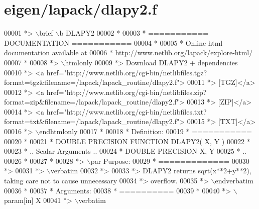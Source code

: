 \hypertarget{eigen_2lapack_2dlapy2_8f_source}{}\section{eigen/lapack/dlapy2.f}
\label{eigen_2lapack_2dlapy2_8f_source}

\begin{DoxyCode}
00001 \textcolor{comment}{*> \(\backslash\)brief \(\backslash\)b DLAPY2}
00002 \textcolor{comment}{*}
00003 \textcolor{comment}{*  =========== DOCUMENTATION ===========}
00004 \textcolor{comment}{*}
00005 \textcolor{comment}{* Online html documentation available at }
00006 \textcolor{comment}{*            http://www.netlib.org/lapack/explore-html/ }
00007 \textcolor{comment}{*}
00008 \textcolor{comment}{*> \(\backslash\)htmlonly}
00009 \textcolor{comment}{*> Download DLAPY2 + dependencies }
00010 \textcolor{comment}{*> <a
       href="http://www.netlib.org/cgi-bin/netlibfiles.tgz?format=tgz&filename=/lapack/lapack\_routine/dlapy2.f"> }
00011 \textcolor{comment}{*> [TGZ]</a> }
00012 \textcolor{comment}{*> <a
       href="http://www.netlib.org/cgi-bin/netlibfiles.zip?format=zip&filename=/lapack/lapack\_routine/dlapy2.f"> }
00013 \textcolor{comment}{*> [ZIP]</a> }
00014 \textcolor{comment}{*> <a
       href="http://www.netlib.org/cgi-bin/netlibfiles.txt?format=txt&filename=/lapack/lapack\_routine/dlapy2.f"> }
00015 \textcolor{comment}{*> [TXT]</a>}
00016 \textcolor{comment}{*> \(\backslash\)endhtmlonly }
00017 \textcolor{comment}{*}
00018 \textcolor{comment}{*  Definition:}
00019 \textcolor{comment}{*  ===========}
00020 \textcolor{comment}{*}
00021 \textcolor{comment}{*       DOUBLE PRECISION FUNCTION DLAPY2( X, Y )}
00022 \textcolor{comment}{* }
00023 \textcolor{comment}{*       .. Scalar Arguments ..}
00024 \textcolor{comment}{*       DOUBLE PRECISION   X, Y}
00025 \textcolor{comment}{*       ..}
00026 \textcolor{comment}{*  }
00027 \textcolor{comment}{*}
00028 \textcolor{comment}{*> \(\backslash\)par Purpose:}
00029 \textcolor{comment}{*  =============}
00030 \textcolor{comment}{*>}
00031 \textcolor{comment}{*> \(\backslash\)verbatim}
00032 \textcolor{comment}{*>}
00033 \textcolor{comment}{*> DLAPY2 returns sqrt(x**2+y**2), taking care not to cause unnecessary}
00034 \textcolor{comment}{*> overflow.}
00035 \textcolor{comment}{*> \(\backslash\)endverbatim}
00036 \textcolor{comment}{*}
00037 \textcolor{comment}{*  Arguments:}
00038 \textcolor{comment}{*  ==========}
00039 \textcolor{comment}{*}
00040 \textcolor{comment}{*> \(\backslash\)param[in] X}
00041 \textcolor{comment}{*> \(\backslash\)verbatim}

\end{DoxyCode}
